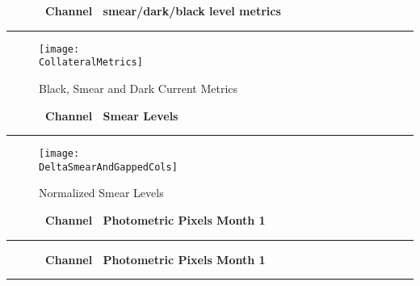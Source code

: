 
\cleardoublepage
\begin{figure*}[h!]
  \centering
  \hfill
  {\Huge {\bf \quarter\ Channel \channel\ smear/dark/black level metrics}}
  \hfill
\end{figure*}
\hrule
\begin{figure*}[h!]
  \centering
  \texttt{[image: \\CollateralMetrics]}
  \caption{Black, Smear and Dark Current Metrics}
\end{figure*}


\cleardoublepage
\begin{figure*}[h!]
  \centering
  \hfill
  {\Huge {\bf \quarter\ Channel \channel\ Smear Levels}}
  \hfill
\end{figure*}
\hrule

\begin{figure*}[h!]
  \centering
  \texttt{[image: \\DeltaSmearAndGappedCols]}
  \caption{Normalized Smear Levels}
\end{figure*}


\cleardoublepage
\begin{figure*}[h!]
  \centering
  \hfill
  {\Huge {\bf \quarter\ Channel \channel\ Photometric Pixels Month 1}}
  \hfill
\end{figure*}
\hrule
\begin{figure*}[h!]
  \centering
\end{figure*}


\cleardoublepage
\begin{figure*}[h!]
  \centering
  \hfill
  {\Huge {\bf \quarter\ Channel \channel\ Photometric Pixels Month 1}}
  \hfill
\end{figure*}
\hrule

